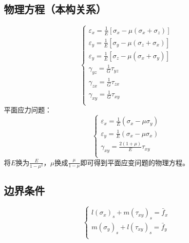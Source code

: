 \subsection{物理方程（本构关系）}
\begin{equation}
	\begin{cases}
	\varepsilon _x=\frac{1}{E}\left[ \sigma _x-\mu \left( \sigma _x+\sigma _z \right) \right]\\
	\varepsilon _y=\frac{1}{E}\left[ \sigma _y-\mu \left( \sigma _z+\sigma _x \right) \right]\\
	\varepsilon _y=\frac{1}{E}\left[ \sigma _z-\mu \left( \sigma _x+\sigma _y \right) \right]\\
	\gamma _{yz}=\frac{1}{G}\tau _{yz}\\
	\gamma _{zx}=\frac{1}{G}\tau _{zx}\\
	\gamma _{xy}=\frac{1}{G}\tau _{xy}\\
	\end{cases}
\end{equation}
平面应力问题：
\begin{equation}
	\begin{cases}
	\varepsilon _x=\frac{1}{E}\left( \sigma _x-\mu \sigma _y \right)\\
	\varepsilon _y=\frac{1}{E}\left( \sigma _x-\mu \sigma _x \right)\\
	\gamma _{xy}=\frac{2\left( 1+\mu \right)}{E}\tau _{xy}\\
	\end{cases}
\end{equation}
将$E$换为$\frac{E}{1-\mu ^2}$，$\mu $换成$\frac{\mu}{1-\mu}$即可得到平面应变问题的物理方程。
\subsection{边界条件}
\begin{equation}
	\begin{cases}
	l\left( \sigma _x \right) _s+m\left( \tau _{xy} \right) _s=\bar{f}_x\\
	m\left( \sigma _y \right) _s+l\left( \tau _{xy} \right) _s=\bar{f}_y\\
	\end{cases}
\end{equation}
